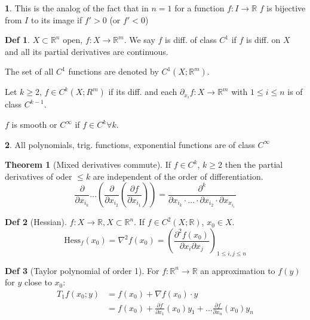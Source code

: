 \documentclass[a4paper, 10pt]{article}
\theoremstyle{definition}
\newtheorem*{definition}{Def}
\theoremstyle{colored}
\newtheorem*{note_wrapper}{}
\theoremstyle{ex}
\theoremstyle{named}
\newtheorem*{ntheorem_wrapper}{Theorem}
\newenvironment{ntheorem}%
    {\begin{mdframed}[style=important]\begin{ntheorem_wrapper}}%
    {\end{ntheorem_wrapper}\end{mdframed}}
\newenvironment{note}%
    {\begin{mdframed}[style=trick]\begin{note_wrapper}}%
    {\end{note_wrapper}\end{mdframed}}
\newcommand{\R}{\mathbb{R}}
\begin{document}
\begin{note}
    This is the analog of the fact that in \(n = 1\) for a function \(f : I \to \R\) \(f\) is bijective from \(I\) to its image if \(f' > 0\) (or \(f' < 0\))
\end{note}

\begin{definition}
    \(X \subset \R^n\) open, \(f: X \to \R^m\). We say \(f\) is diff. of class \(C^1\) if \(f\) is diff. on \(X\) and all its partial derivatives are continuous.

    The set of all \(C^1\) functions are denoted by \(C^1(X ; \R^m)\).

    Let \(k \geq 2\), \(f \in C^k(X; R^m)\) if its diff. and each \(\partial_{x_i}f: X \to \R^m\) with \(1 \leq i \leq n\) is of class \(C^{k - 1}\).

    \(f\) is smooth or \(C^\infty\) if \(f \in C^k \forall k\).
\end{definition}

\begin{note}
    All polynomials, trig. functions, exponential functions are of class \(C^\infty\)
\end{note}

\begin{ntheorem}[Mixed derivatives commute]
    If \(f \in C^k\), \(k \geq 2\) then the partial derivatives of oder \(\leq k\) are independent of the order of differentiation.
    \[\frac{\partial}{\partial x_{i_k}} \dots (\frac{\partial}{\partial x_{i_2}}(\frac{\partial f}{\partial x_{i_1}})) = \frac{\partial^k}{\partial x_{i_k} \cdot \ldots \cdot \partial x_{i_2} \cdot \partial x_{x_{i_1}}}\]
\end{ntheorem}

\begin{definition}[Hessian]
    \(f: X \to \R, X \subset \R^n\). If \(f \in C^2(X;\R)\), \(x_0 \in X\).
    \[\text{Hess}_f(x_0) = \nabla^2 f(x_0) = \left(\frac{\partial^2 f(x_0)}{\partial x_i \partial x_j}\right)_{1 \leq i,j \leq n}\]
\end{definition}

\begin{definition}[Taylor polynomial of order 1]
    For \(f: \R^n \to \R\) an approximation to \(f(y)\) for \(y\) close to \(x_0\):
    \begin{align*}
        T_1 f(x_0; y) &= f(x_0) + \nabla f(x_0) \cdot y \\
        &= f(x_0) + \frac{\partial f}{\partial x_1} (x_0) y_1 + \ldots \frac{\partial f}{\partial x_n} (x_0) y_n
    \end{align*}
\end{definition}
\end{document}
